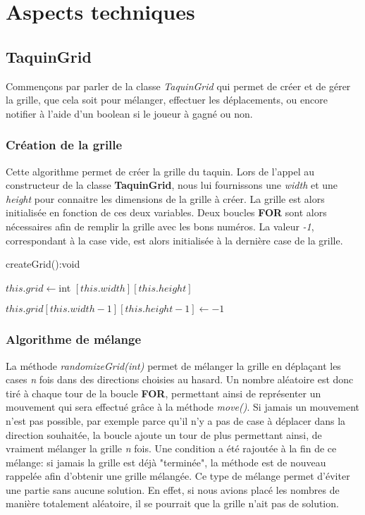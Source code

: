 \chapter{Aspects techniques}

	\section{TaquinGrid}

		Commençons par parler de la classe \textit{TaquinGrid} qui permet de créer et de gérer la grille, que cela soit pour mélanger, effectuer les déplacements, ou encore notifier à l'aide d'un boolean si le joueur à gagné ou non.

		\subsection{Création de la grille}

			Cette algorithme permet de créer la grille du taquin. Lors de l'appel au constructeur de la classe \textbf{TaquinGrid}, nous lui fournissons une \textit{width} et une \textit{height} pour connaitre les dimensions de la grille à créer. La grille est alors initialisée en fonction de ces deux variables. Deux boucles \textbf{FOR} sont alors nécessaires afin de remplir la grille avec les bons numéros. La valeur \textit{-1}, correspondant à la case vide, est alors initialisée à la dernière case de la grille.

			\begin{algorithm}[H]
				\caption{createGrid():void}
				$this.grid \leftarrow $int $[this.width][this.height]$


				$this.grid[this.width-1][this.height-1] \leftarrow -1$
			\end{algorithm}

		\subsection{Algorithme de mélange}

			La méthode \textit{randomizeGrid(int)} permet de mélanger la grille en déplaçant les cases \textit{n} fois dans des directions choisies au hasard. Un nombre aléatoire est donc tiré à chaque tour de la boucle \textbf{FOR}, permettant ainsi de représenter un mouvement qui sera effectué grâce à la méthode \textit{move()}. Si jamais un mouvement n'est pas possible, par exemple parce qu'il n'y a pas de case à déplacer dans la direction souhaitée, la boucle ajoute un tour de plus permettant ainsi, de vraiment mélanger la grille \textit{n} fois. Une condition a été rajoutée à la fin de ce mélange: si jamais la grille est déjà "terminée", la méthode est de nouveau rappelée afin d'obtenir une grille mélangée. Ce type de mélange permet d'éviter une partie sans aucune solution. En effet, si nous avions placé les nombres de manière totalement aléatoire, il se pourrait que la grille n'ait pas de solution.

